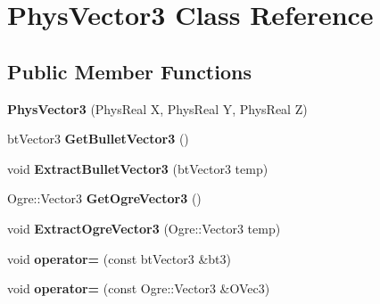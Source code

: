 \hypertarget{classPhysVector3}{
\section{PhysVector3 Class Reference}
\label{da/d11/classPhysVector3}
}
\subsection*{Public Member Functions}
\begin{DoxyCompactItemize}
\item 
\hypertarget{classPhysVector3_aad8161121a45b20dde0e3cc6959801be}{
{\bfseries PhysVector3} (PhysReal X, PhysReal Y, PhysReal Z)}
\label{da/d11/classPhysVector3_aad8161121a45b20dde0e3cc6959801be}

\item 
\hypertarget{classPhysVector3_adfc5f9e933a94be994ce5ce0c38d1f96}{
btVector3 {\bfseries GetBulletVector3} ()}
\label{da/d11/classPhysVector3_adfc5f9e933a94be994ce5ce0c38d1f96}

\item 
\hypertarget{classPhysVector3_a71a78da9e8011cb727010f8ba3acf546}{
void {\bfseries ExtractBulletVector3} (btVector3 temp)}
\label{da/d11/classPhysVector3_a71a78da9e8011cb727010f8ba3acf546}

\item 
\hypertarget{classPhysVector3_a01facc2b865bb79c589ed1985dd6c49c}{
Ogre::Vector3 {\bfseries GetOgreVector3} ()}
\label{da/d11/classPhysVector3_a01facc2b865bb79c589ed1985dd6c49c}

\item 
\hypertarget{classPhysVector3_a422acbc95f72d00a26cb477ab7db5e87}{
void {\bfseries ExtractOgreVector3} (Ogre::Vector3 temp)}
\label{da/d11/classPhysVector3_a422acbc95f72d00a26cb477ab7db5e87}

\item 
\hypertarget{classPhysVector3_a76af5753ff1a65261bcb0d543999eb3e}{
void {\bfseries operator=} (const btVector3 \&bt3)}
\label{da/d11/classPhysVector3_a76af5753ff1a65261bcb0d543999eb3e}

\item 
\hypertarget{classPhysVector3_a00323a54e86ab2e6cf41ddbfbc2a97cd}{
void {\bfseries operator=} (const Ogre::Vector3 \&OVec3)}
\label{da/d11/classPhysVector3_a00323a54e86ab2e6cf41ddbfbc2a97cd}

\end{DoxyCompactItemize}
